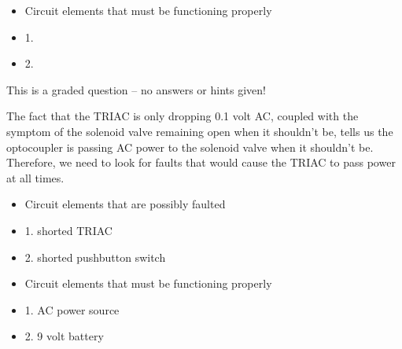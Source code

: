 \begin{itemize}
\item{} Circuit elements that must be functioning properly
\item{1.} 
\item{2.} 
\end{itemize}

\vfil 

\eject






This is a graded question -- no answers or hints given!







The fact that the TRIAC is only dropping 0.1 volt AC, coupled with the symptom of the solenoid valve remaining open when it shouldn't be, tells us the optocoupler is passing AC power to the solenoid valve when it shouldn't be.  Therefore, we need to look for faults that would cause the TRIAC to pass power at all times.

\begin{itemize}
\item{} Circuit elements that are possibly faulted
\item{1.} shorted TRIAC 
\item{2.} shorted pushbutton switch
\end{itemize}

\begin{itemize}
\item{} Circuit elements that must be functioning properly
\item{1.} AC power source
\item{2.} 9 volt battery
\end{itemize}




